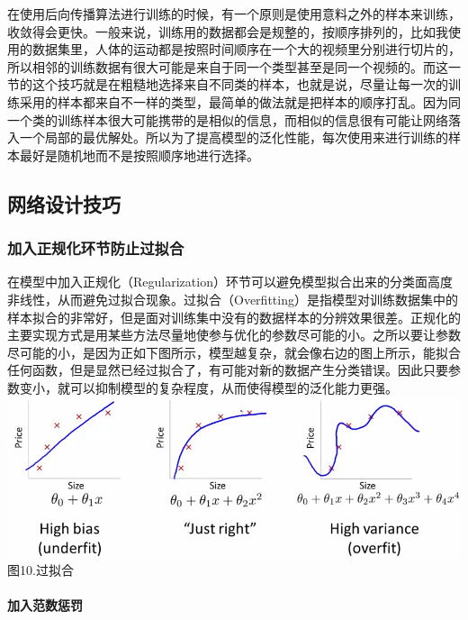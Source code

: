 在使用后向传播算法进行训练的时候，有一个原则是使用意料之外的样本来训练，收敛得会更快。一般来说，训练用的数据都会是规整的，按顺序排列的，比如我使用的数据集里，人体的运动都是按照时间顺序在一个大的视频里分别进行切片的，所以相邻的训练数据有很大可能是来自于同一个类型甚至是同一个视频的。而这一节的这个技巧就是在粗糙地选择来自不同类的样本，也就是说，尽量让每一次的训练采用的样本都来自不一样的类型，最简单的做法就是把样本的顺序打乱。因为同一个类的训练样本很大可能携带的是相似的信息，而相似的信息很有可能让网络落入一个局部的最优解处。所以为了提高模型的泛化性能，每次使用来进行训练的样本最好是随机地而不是按照顺序地进行选择。

\subsection{网络设计技巧}\label{ux7f51ux7edcux8bbeux8ba1ux6280ux5de7}

\subsubsection{加入正规化环节防止过拟合}\label{ux52a0ux5165ux6b63ux89c4ux5316ux73afux8282ux9632ux6b62ux8fc7ux62dfux5408}

在模型中加入正规化（Regularization）环节可以避免模型拟合出来的分类面高度非线性，从而避免过拟合现象。过拟合（Overfitting）是指模型对训练数据集中的样本拟合的非常好，但是面对训练集中没有的数据样本的分辨效果很差。正规化的主要实现方式是用某些方法尽量地使参与优化的参数尽可能的小。之所以要让参数尽可能的小，是因为正如下图所示，模型越复杂，就会像右边的图上所示，能拟合任何函数，但是显然已经过拟合了，有可能对新的数据产生分类错误。因此只要参数变小，就可以抑制模型的复杂程度，从而使得模型的泛化能力更强。\\\includegraphics{picture/overfit.jpg}\\图10.过拟合

\paragraph{加入范数惩罚}\label{ux52a0ux5165ux8303ux6570ux60e9ux7f5a}

